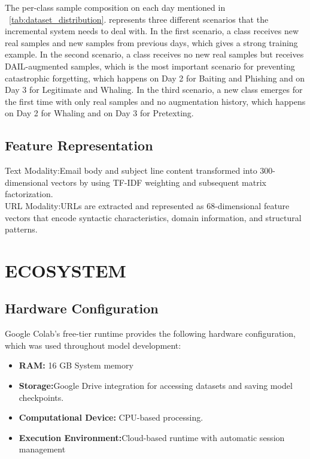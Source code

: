The per-class sample composition on each day mentioned in ~\ref{tab:dataset_distribution}.  represents three different scenarios that the incremental system needs to deal with. In the first scenario, a class receives new real samples and new samples from previous days, which gives a strong training example. In the second scenario, a class receives no new real samples but receives DAIL-augmented samples, which is the most important scenario for preventing catastrophic forgetting, which happens on Day 2 for Baiting and Phishing and on Day 3 for Legitimate and Whaling. In the third scenario, a new class emerges for the first time with only real samples and no augmentation history, which happens on Day 2 for Whaling and on Day 3 for Pretexting.
\subsection{Feature Representation} 
Text Modality:Email body and subject line content transformed into 300-dimensional vectors by using TF-IDF weighting and subsequent matrix factorization.\\
URL Modality:URLs are extracted and represented as 68-dimensional feature vectors that encode syntactic characteristics, domain information, and structural patterns.\\




\section{ECOSYSTEM}
\subsection{Hardware Configuration} 
Google Colab’s free-tier runtime provides the following hardware
configuration, which was used throughout model development:
\begin{itemize}
    \item \textbf{RAM:} 16 GB System memory 
    \item \textbf{Storage:}Google Drive integration for accessing datasets and saving model checkpoints.
    \item \textbf{Computational Device:} CPU-based processing.
    \item \textbf{Execution Environment:}Cloud-based runtime with automatic
session management
    
\end{itemize}

